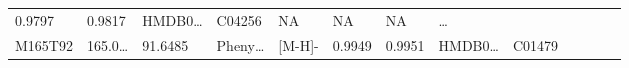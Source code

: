 \documentclass[
]{article}
\begin{document}
\begin{longtable}[]{@{}lllllllllllll@{}}
\begin{minipage}[t]{0.07\columnwidth}
0.9797\strut
\end{minipage} & \begin{minipage}[t]{0.07\columnwidth}\raggedright
0.9817\strut
\end{minipage} & \begin{minipage}[t]{0.05\columnwidth}\raggedright
HMDB0\ldots{}\strut
\end{minipage} & \begin{minipage}[t]{0.04\columnwidth}\raggedright
C04256\strut
\end{minipage} & \begin{minipage}[t]{0.05\columnwidth}\raggedright
NA\strut
\end{minipage} & \begin{minipage}[t]{0.05\columnwidth}\raggedright
NA\strut
\end{minipage} & \begin{minipage}[t]{0.05\columnwidth}\raggedright
NA\strut
\end{minipage} & \begin{minipage}[t]{0.02\columnwidth}\raggedright
\ldots{}\strut
\end{minipage}\tabularnewline
\begin{minipage}[t]{0.05\columnwidth}\raggedright
M165T92\strut
\end{minipage} & \begin{minipage}[t]{0.05\columnwidth}\raggedright
165.0\ldots{}\strut
\end{minipage} & \begin{minipage}[t]{0.05\columnwidth}\raggedright
91.6485\strut
\end{minipage} & \begin{minipage}[t]{0.05\columnwidth}\raggedright
Pheny\ldots{}\strut
\end{minipage} & \begin{minipage}[t]{0.05\columnwidth}\raggedright
{[}M-H{]}-\strut
\end{minipage} & \begin{minipage}[t]{0.07\columnwidth}\raggedright
0.9949\strut
\end{minipage} & \begin{minipage}[t]{0.07\columnwidth}\raggedright
0.9951\strut
\end{minipage} & \begin{minipage}[t]{0.05\columnwidth}\raggedright
HMDB0\ldots{}\strut
\end{minipage} & \begin{minipage}[t]{0.04\columnwidth}\raggedright
C01479\strut

\end{minipage}
\end{longtable}
\end{document}
